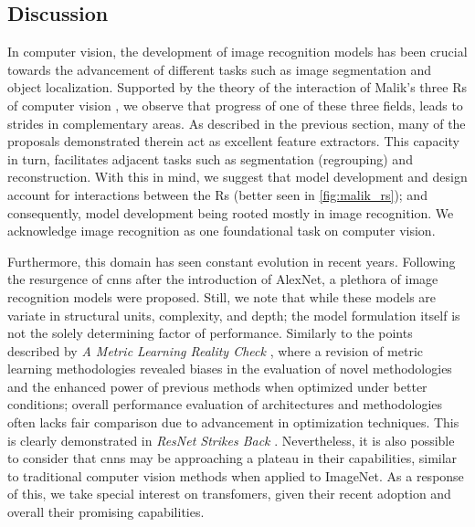 \subsection{Discussion}
\label{subsec:rel_recon_discussion}
In computer vision, the development of image recognition models has been crucial 
towards the advancement of different tasks such as image segmentation and object localization. 
Supported by the theory of the interaction of Malik's three Rs of computer vision 
\autocite{malik2016three}, we observe that progress of one of these three fields, leads to strides 
in complementary areas. As described in the previous section, many of the proposals demonstrated 
therein act as excellent feature extractors. This capacity in turn, facilitates adjacent tasks 
such as segmentation (regrouping) and reconstruction. With this in mind, we suggest that model 
development and design account for interactions between the Rs (better seen in  
\autoref{fig:malik_rs}); and consequently, model development being rooted mostly in image 
recognition. We acknowledge image recognition as one foundational task on computer vision.



\noindent Furthermore, this domain has seen constant evolution in recent years. Following the 
resurgence of \glspl{cnn} after the introduction of AlexNet, a plethora of image recognition models 
were proposed. Still, we note that while these models are variate in structural units, complexity, 
and depth; the model formulation  itself is not the solely determining factor of performance.  
Similarly to the points described by \emph{A Metric Learning Reality 
Check} \autocite{musgrave2020metric}, where a revision of metric learning methodologies revealed 
biases in the evaluation of novel methodologies and the enhanced power of 
previous methods when optimized under better conditions; overall performance evaluation of 
architectures and methodologies often lacks fair comparison due to advancement in optimization 
techniques. This is clearly demonstrated in \emph{ResNet Strikes Back} \autocite{wightman2021resnet}. 
Nevertheless, it is also possible to consider that \glspl{cnn} may be approaching a plateau in 
their capabilities, similar to traditional computer vision methods  when applied to ImageNet. As 
a response of this, we take special interest on transfomers, given their recent adoption and 
overall their promising capabilities. \\

